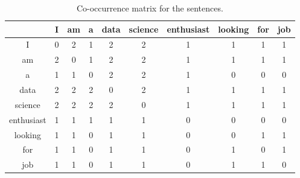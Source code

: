 \begin{table}[h]
  \centering
  \caption{Co-occurrence matrix for the sentences.}
  \label{table:1}
  \begin{tabular}{|c|c|c|c|c|c|c|c|c|c|}
    \hline
     & I & am & a & data & science & enthusiast & looking & for & job \\
    \hline
    I & 0 & 2 & 1 & 2 & 2 & 1 & 1 & 1 & 1 \\
    \hline
    am & 2 & 0 & 1 & 2 & 2 & 1 & 1 & 1 & 1 \\
    \hline
    a & 1 & 1 & 0 & 2 & 2 & 1 & 0 & 0 & 0 \\
    \hline
    data & 2 & 2 & 2 & 0 & 2 & 1 & 1 & 1 & 1 \\
    \hline
    science & 2 & 2 & 2 & 2 & 0 & 1 & 1 & 1 & 1 \\
    \hline
    enthusiast & 1 & 1 & 1 & 1 & 1 & 0 & 0 & 0 & 0 \\
    \hline
    looking & 1 & 1 & 0 & 1 & 1 & 0 & 0 & 1 & 1 \\
    \hline
    for & 1 & 1 & 0 & 1 & 1 & 0 & 1 & 0 & 1 \\
    \hline
    job & 1 & 1 & 0 & 1 & 1 & 0 & 1 & 1 & 0 \\
    \hline
  \end{tabular}
\end{table}

